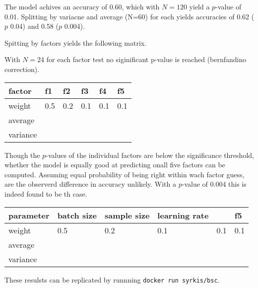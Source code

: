 The model achives an accuracy of 0.60, which with $N=120$ yield a $p$-value of 0.01.
Splitting by variacne and average (N=60) for each yields accuracies of 0.62 ($p$ 0.04) and 0.58 ($p$ 0.004).

Spitting by factors yields the following matrix.

With $N=24$ for each factor test no siginificant p-value is reached (bernfandino correction). 

\begin{table}[H]
\centering
\begin{tabular}{|l|l|l|l|l|l|} 
\hline
factor & f1 & f2 & f3 & f4 & f5 \\ 
\hline
weight & 0.5 & 0.2 & 0.1 & 0.1 & 0.1 \\ 
\hline
average &  &  &  &  &   \\
\hline
variance &  &  &  &  &   \\
\hline
\end{tabular}
\end{table}

Though the $p$-values of the individual factors are below the significance threshold, whether the model is equally good at predicting onall five factors can be computed.
Assuming equal probability of being right within wach factor guess, are the observerd difference in accuracy unlikely.
With a $p$-value of 0.004 this is indeed found to be th case.

\begin{table}[H]
\centering
\begin{tabular}{|l|l|l|l|l|l|} 
\hline
parameter & batch size & sample size & learning rate &  & f5 \\ 
\hline
weight & 0.5 & 0.2 & 0.1 & 0.1 & 0.1 \\ 
\hline
average &  &  &  &  &   \\
\hline
variance &  &  &  &  &   \\
\hline
\end{tabular}
\end{table}

These resulsts can be replicated by runnning \texttt{docker run syrkis/bsc}.
